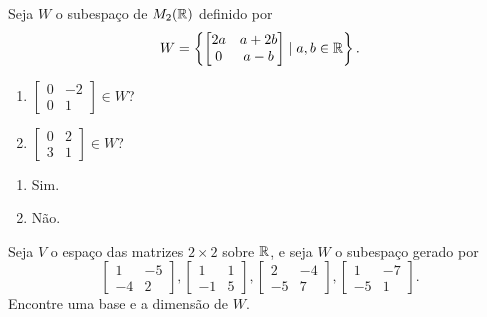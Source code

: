 \documentclass[12pt]{exam}
\begin{document}
\begin{exercicio}
	Seja $W$ o subespa\c{c}o de $M_2(\mathbb{R})$ definido por
	\[
	W = \left\{\begin{bmatrix}2a & a + 2b\\0 & a - b\end{bmatrix} \mid a, b \in \mathbb{R}\right\}.
	\]
	\begin{enumerate}[label={\alph*})]
		\item $\begin{bmatrix}0 & -2\\0 & 1\end{bmatrix} \in W$?
		\item $\begin{bmatrix}0 & 2\\3 & 1\end{bmatrix} \in W$?
	\end{enumerate}
	\begin{solucao}
		\begin{enumerate}[label={\alph*})]
			\item Sim.
			\item N\~ao.
		\end{enumerate}
	\end{solucao}
\end{exercicio}

\begin{exercicio}
	Seja $V$ o espa\c{c}o das matrizes $2 \times 2$ sobre $\mathbb{R}$, e seja $W$ o subespa\c{c}o gerado por
	\[
	\begin{bmatrix}
		1 & -5\\
		-4 & 2
	\end{bmatrix},
	\begin{bmatrix}
		1 & 1\\
		-1 & 5
	\end{bmatrix},
	\begin{bmatrix}
		2 & -4\\
		-5 & 7
	\end{bmatrix},
	\begin{bmatrix}
		1 & -7\\
		-5 & 1
	\end{bmatrix}.
	\]
	Encontre uma base e a dimens\~ao de $W$.
\end{exercicio}
\end{document}
